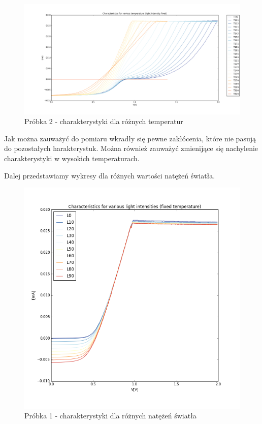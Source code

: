 \documentclass[a4paper,12pt]{article}
\begin{document}
\begin{figure} [H]
  \begin{center}
    \includegraphics[width = 15cm]{probka2_temperatura.png}
    \caption{Próbka 2 - charakterystyki dla różnych temperatur}
  \end{center}
\end{figure}
Jak można zauważyć do pomiaru wkradły się pewne zakłócenia, które nie  pasują do pozostałych harakterystuk. Można również zauważyć zmienijące się nachylenie charakterystyki w wysokich temperaturach.


Dalej przedstawiamy wykresy dla różnych wartości natężeń światła.
\begin{figure} [H]
  \begin{center}
    \includegraphics[width = 13cm]{probka1_swiatlo.png}
    \caption{Próbka 1 - charakterystyki dla różnych natężeń światła}
  \end{center}
\end{figure}
\end{document}
